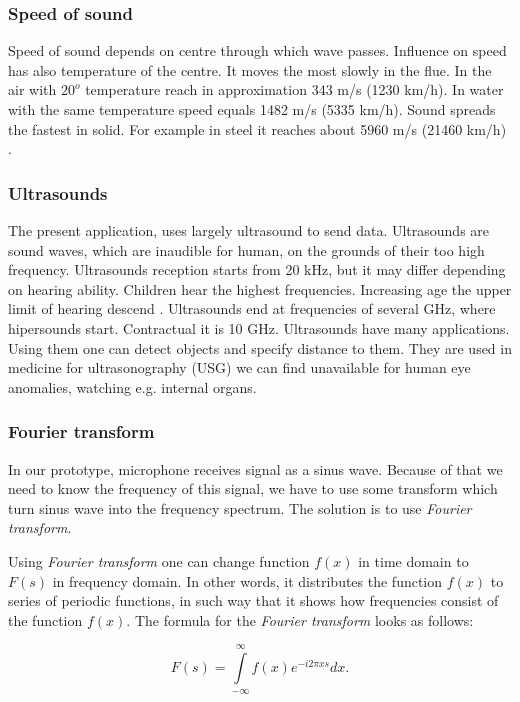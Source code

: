 \documentclass[11pt,titlepage]{article}
\theoremstyle{plain}
\begin{document}
\subsubsection{Speed of sound}

Speed of sound depends on centre through which wave passes. Influence on speed has also temperature of the centre. It moves the most slowly in the flue. In the air with $20^o$ temperature reach in  approximation 343 m/s (1230 km/h). In water with the same temperature speed equals 1482 m/s (5335 km/h). Sound spreads the fastest in solid. For example in steel it reaches about 5960 m/s (21460 km/h) \cite{sound_speed}.

\subsubsection{Ultrasounds}
The present application, uses largely ultrasound to send data. Ultrasounds are sound waves, which are inaudible for human, on the grounds of their too high frequency. Ultrasounds reception starts from 20 kHz, but it may differ depending on hearing ability. Children hear the highest frequencies. Increasing age the upper limit of hearing descend \cite{limit_sound}. Ultrasounds end at frequencies of several GHz, where hipersounds start. Contractual it is 10 GHz. Ultrasounds have many applications. Using them one can detect objects and specify distance to them. They are used in medicine for ultrasonography (USG) we can find unavailable for human eye anomalies, watching e.g. internal organs. 

\subsubsection{Fourier transform}
In our prototype, microphone receives signal as a sinus wave. Because of that we need to know the frequency of this signal, we have to use some transform which turn sinus wave into the frequency spectrum. The solution is to use \textit{Fourier transform}.

\vspace{5mm}

Using \textit{Fourier transform} one can change function $f(x)$ in time domain to $F(s)$ in frequency domain. In other words, it distributes the function $f(x)$ to series of periodic functions, in such way that it shows how frequencies consist of the function $f(x)$. The formula for the \textit{Fourier transform} looks as follows:

\begin{equation}
	F(s) = \int\limits^\infty_{-\infty} f(x) e^{-i2\pi xs} dx.
\end{equation}
\end{document}
